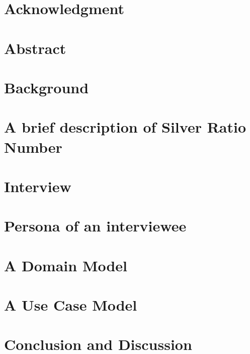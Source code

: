 \documentclass[a4paper,12pt]{report}
\begin{document}


\newpage

\newpage
{}

 \chapter*{\centering Acknowledgment}


\newpage
{}
\chapter*{\centering Abstract}


\newpage
{}
\tableofcontents

\newpage
{}
\chapter[Background]{Background}


\chapter{A brief description of Silver Ratio Number}


\chapter{Interview} 


\chapter{Persona of an interviewee}


\chapter{A Domain Model}


\chapter{A Use Case Model}


\chapter{Conclusion and Discussion}





\end{document}
